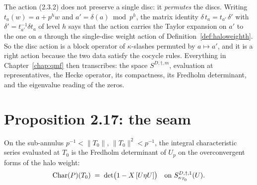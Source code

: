 \begin{definition}
  \label{def:discforms}
  \leanok
  The action (2.3.2) does not preserve a single disc: it \emph{permutes} the discs.  Writing
  $t_a(w) = a+p^{h}w$ and $a' = \delta(a)\bmod p^{h}$, the matrix identity
  $\delta\, t_a = t_{a'}\,\delta'$ with $\delta' = t_{a'}^{-1}\delta t_a$ of level $h$ says that
  the action carries the Taylor expansion on $a'$ to the one on $a$ through the single-disc
  weight action of Definition~\ref{def:haloweighth}.  So the disc action is a block operator of
  $\kappa$-slashes permuted by $a\mapsto a'$, and it is a right action because the two data
  satisfy the cocycle rules.  Everything in Chapter~\ref{chap:qmf} then transcribes: the space
  $S^{D,\dagger,m}$, evaluation at representatives, the Hecke operator, its compactness, its
  Fredholm determinant, and the eigenvalue reading of the zeros.
\end{definition}

\section{Proposition 2.17: the seam}
\label{sec:seam}

\begin{theorem}[{\cite[Proposition 2.17]{LWX}} at $m=1$]
  \label{thm:lwx-prop217}
  \leanok
  On the sub-annulus $p^{-1}<\lVert T_0\rVert$, $\lVert T_0\rVert^{2}<p^{-1}$, the integral
  characteristic series evaluated at $T_0$ is the Fredholm determinant of $U_p$ on the
  overconvergent forms of the halo weight:
  \[
    \operatorname{Char}(P)(T_0) \;=\; \det\bigl(1 - X\,[U\eta U]\bigr)
    \quad\text{on } S^{D,\dagger,1}_{\kappa_{T_0}}(U).
  \]
\end{theorem}


